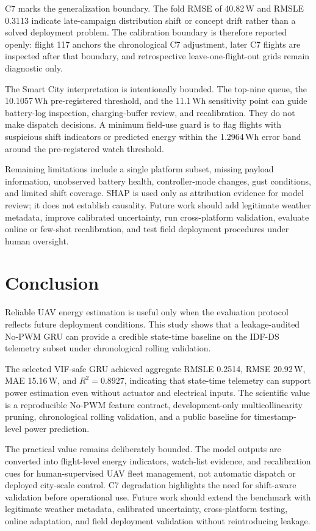 \documentclass[runningheads,a4paper]{llncs}
\begin{document}
C7 marks the generalization boundary. The fold RMSE of 40.82\,W and RMSLE 0.3113 indicate late-campaign distribution shift or concept drift rather than a solved deployment problem. The calibration boundary is therefore reported openly: flight 117 anchors the chronological C7 adjustment, later C7 flights are inspected after that boundary, and retrospective leave-one-flight-out grids remain diagnostic only.

The Smart City interpretation is intentionally bounded. The top-nine queue, the 10.1057\,Wh pre-registered threshold, and the 11.1\,Wh sensitivity point can guide battery-log inspection, charging-buffer review, and recalibration. They do not make dispatch decisions. A minimum field-use guard is to flag flights with suspicious shift indicators or predicted energy within the 1.2964\,Wh error band around the pre-registered watch threshold.

Remaining limitations include a single platform subset, missing payload information, unobserved battery health, controller-mode changes, gust conditions, and limited shift coverage. SHAP is used only as attribution evidence for model review; it does not establish causality. Future work should add legitimate weather metadata, improve calibrated uncertainty, run cross-platform validation, evaluate online or few-shot recalibration, and test field deployment procedures under human oversight.

\section{Conclusion}

Reliable UAV energy estimation is useful only when the evaluation protocol reflects future deployment conditions. This study shows that a leakage-audited No-PWM GRU can provide a credible state-time baseline on the IDF-DS telemetry subset under chronological rolling validation.

The selected VIF-safe GRU achieved aggregate RMSLE 0.2514, RMSE 20.92\,W, MAE 15.16\,W, and $R^2=0.8927$, indicating that state-time telemetry can support power estimation even without actuator and electrical inputs. The scientific value is a reproducible No-PWM feature contract, development-only multicollinearity pruning, chronological rolling validation, and a public baseline for timestamp-level power prediction.

The practical value remains deliberately bounded. The model outputs are converted into flight-level energy indicators, watch-list evidence, and recalibration cues for human-supervised UAV fleet management, not automatic dispatch or deployed city-scale control. C7 degradation highlights the need for shift-aware validation before operational use. Future work should extend the benchmark with legitimate weather metadata, calibrated uncertainty, cross-platform testing, online adaptation, and field deployment validation without reintroducing leakage.
\end{document}
